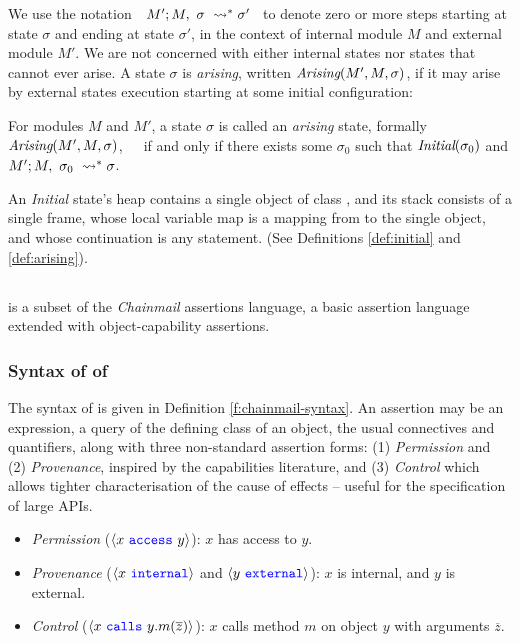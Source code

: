 We  use the notation\ \  $M' ; M,\ \sigma\ \leadsto^* \sigma'$ \ 
to denote
zero or more %
steps starting at state $\sigma$ and ending at state $\sigma'$, in the context of internal module 
$M$ and external module $M'$.
We are not concerned with either internal states nor states that cannot ever arise.
{A state $\sigma$ is \emph{arising},}  written $\textit{Arising}(M', M, \sigma)$, {if it  may arise by external states} execution
starting at some initial configuration:



\begin{definition}
\label{def:arising}
For   modules $M$ and  $M'$, a %
 state $\sigma$ is 
called an \emph{arising} state, formally \ \ \ $\textit{Arising}(M', M, \sigma)$,\ \ \ 
if and only if there exists some $\sigma_0$ such that $\textit{Initial}(\sigma_0)$ and
$M' ; M,\ \sigma_0\ \leadsto^* \sigma$.
\end{definition}

An \emph{Initial} state's heap
contains a single object of class , and
its  stack   consists of a single frame, whose local variable map is a
mapping from \prg{this} to the single object, and whose continuation is  any statement.
(See Definitions \ref{def:initial} and \ref{def:arising}).

\subsection{\SpecO}
\label{sub:SpecO}

\SpecO is a subset of the \emph{Chainmail} assertions language, \ie
a basic assertion language extended with
object-capability assertions. 


\subsubsection{Syntax of of \SpecO}
The syntax of \SpecO   is given in
Definition \ref{f:chainmail-syntax}.
An assertion may be an expression,   a query of the defining class of
  an object, the usual connectives and quantifiers, along 
with three non-standard assertion forms:
(1) \emph{Permission} and (2) \emph{Provenance}, inspired by the capabilities literature, and
(3) \emph{Control} which allows tighter  characterisation of the cause of effects --  
useful for the specification of large APIs.
\begin{itemize}
\item
\emph{Permission} ($\langle x\ {\color{blue}\texttt{access}}\ y \rangle$):  
  $x$ has access to $y$.
\item
{\emph{Provenance}} ($\langle x\ {\color{blue}\texttt{internal}}\rangle$ and $\langle y\ {\color{blue}\texttt{external}}\rangle$):   $x$ is internal, and $y$ is external.
\item
\emph{Control} ($\langle x\ {\color{blue}\texttt{calls}}\ y.m(\overline{z}) \rangle$): 
$x$ calls method $m$ on object $y$ with arguments $\overline{z}$.
\end{itemize}


